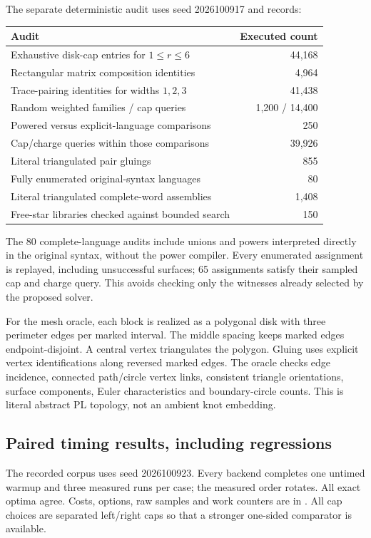 \documentclass[11pt,a4paper]{article}
\theoremstyle{definition}
\newcommand{\code}[1]{\texttt{\detokenize{#1}}}
\begin{document}
The separate deterministic audit uses seed 2026100917 and records:
\begin{center}
\begin{tabular}{p{}r}
\toprule
Audit & Executed count\\
\midrule
Exhaustive disk-cap entries for $1\le r\le6$ & 44,168\\
Rectangular matrix composition identities & 4,964\\
Trace-pairing identities for widths $1,2,3$ & 41,438\\
Random weighted families / cap queries & 1,200 / 14,400\\
Powered versus explicit-language comparisons & 250\\
Cap/charge queries within those comparisons & 39,926\\
Literal triangulated pair gluings & 855\\
Fully enumerated original-syntax languages & 80\\
Literal triangulated complete-word assemblies & 1,408\\
Free-star libraries checked against bounded search & 150\\
\bottomrule
\end{tabular}
\end{center}
The 80 complete-language audits include unions and powers interpreted directly in the original syntax, without the power compiler. Every enumerated assignment is replayed, including unsuccessful surfaces; 65 assignments satisfy their sampled cap and charge query. This avoids checking only the witnesses already selected by the proposed solver.

For the mesh oracle, each block is realized as a polygonal disk with three perimeter edges per marked interval. The middle spacing keeps marked edges endpoint-disjoint. A central vertex triangulates the polygon. Gluing uses explicit vertex identifications along reversed marked edges. The oracle checks edge incidence, connected path/circle vertex links, consistent triangle orientations, surface components, Euler characteristics and boundary-circle counts. This is literal abstract PL topology, not an ambient knot embedding.

\subsection{Paired timing results, including regressions}
The recorded corpus uses seed 2026100923. Every backend completes one untimed warmup and three measured runs per case; the measured order rotates. All exact optima agree. Costs, options, raw samples and work counters are in \code{data/benchmarks.json}. All cap choices are separated left/right caps so that a stronger one-sided comparator is available.
\end{document}
